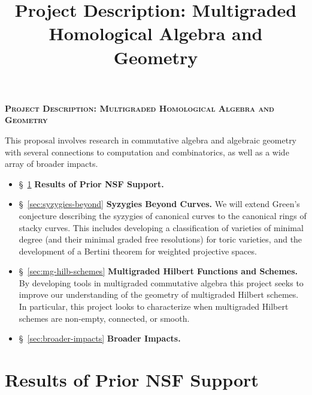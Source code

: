 \documentclass[11pt,reqno]{amsart}
\title{Project Description: Multigraded Homological Algebra and Geometry}
\theoremstyle{remark}
\begin{document}
 
\thispagestyle{empty}
\pagestyle{empty}
\begingroup  
  \centering
  \large\scshape\bfseries Project Description: Multigraded Homological Algebra and Geometry\\[1em]
\endgroup


\setcounter{section}{0}

\noindent This proposal involves research in commutative algebra and algebraic geometry with several connections to computation and combinatorics, as well as a wide array of broader impacts.
\begin{itemize}[leftmargin=*]
	\item \S~\ref{sec:prior-work} \textbf{Results of Prior NSF Support.} 
	\item \S~\ref{sec:syzygies-beyond} \textbf{Syzygies Beyond Curves.} We will extend Green's conjecture describing the syzygies of canonical curves to the canonical rings of stacky curves. This includes developing a classification of varieties of minimal degree (and their minimal graded free resolutions) for toric varieties, and the development of a Bertini theorem for weighted projective spaces.  
	\item \S~\ref{sec:mg-hilb-schemes} \textbf{Multigraded Hilbert Functions and Schemes.} By developing tools in multigraded commutative algebra this project seeks to improve our understanding of the geometry of multigraded Hilbert schemes. In particular, this project looks to characterize when multigraded Hilbert schemes are non-empty, connected, or smooth.
	\item \S~\ref{sec:broader-impacts} \textbf{Broader Impacts.}
\end{itemize}

\section{Results of Prior NSF Support}\label{sec:prior-work}
\end{document}
